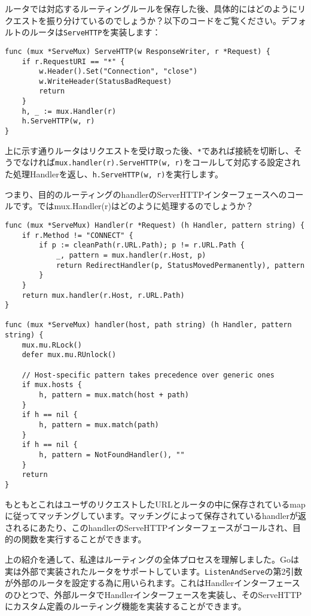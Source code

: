 ルータでは対応するルーティングルールを保存した後、具体的にはどのようにリクエストを振り分けているのでしょうか？以下のコードをご覧ください。デフォルトのルータは\texttt{ServeHTTP}を実装します：

\begin{lstlisting}[numbers=none]
func (mux *ServeMux) ServeHTTP(w ResponseWriter, r *Request) {
    if r.RequestURI == "*" {
        w.Header().Set("Connection", "close")
        w.WriteHeader(StatusBadRequest)
        return
    }
    h, _ := mux.Handler(r)
    h.ServeHTTP(w, r)
}
\end{lstlisting}

上に示す通りルータはリクエストを受け取った後、\texttt{*}であれば接続を切断し、そうでなければ\texttt{mux.handler(r).ServeHTTP(w, r)}をコールして対応する設定された処理Handlerを返し、\texttt{h.ServeHTTP(w, r)}を実行します。

つまり、目的のルーティングのhandlerのServerHTTPインターフェースへのコールです。ではmux.Handler(r)はどのように処理するのでしょうか？

\begin{lstlisting}[numbers=none]
func (mux *ServeMux) Handler(r *Request) (h Handler, pattern string) {
    if r.Method != "CONNECT" {
        if p := cleanPath(r.URL.Path); p != r.URL.Path {
            _, pattern = mux.handler(r.Host, p)
            return RedirectHandler(p, StatusMovedPermanently), pattern
        }
    }    
    return mux.handler(r.Host, r.URL.Path)
}

func (mux *ServeMux) handler(host, path string) (h Handler, pattern string) {
    mux.mu.RLock()
    defer mux.mu.RUnlock()

    // Host-specific pattern takes precedence over generic ones
    if mux.hosts {
        h, pattern = mux.match(host + path)
    }
    if h == nil {
        h, pattern = mux.match(path)
    }
    if h == nil {
        h, pattern = NotFoundHandler(), ""
    }
    return
}
\end{lstlisting}

もともとこれはユーザのリクエストしたURLとルータの中に保存されているmapに従ってマッチングしています。マッチングによって保存されているhandlerが返されるにあたり、このhandlerのServeHTTPインターフェースがコールされ、目的の関数を実行することができます。

上の紹介を通して、私達はルーティングの全体プロセスを理解しました。Goは実は外部で実装されたルータをサポートしています。\texttt{ListenAndServe}の第2引数が外部のルータを設定する為に用いられます。これはHandlerインターフェースのひとつで、外部ルータでHandlerインターフェースを実装し、そのServeHTTPにカスタム定義のルーティング機能を実装することができます。

